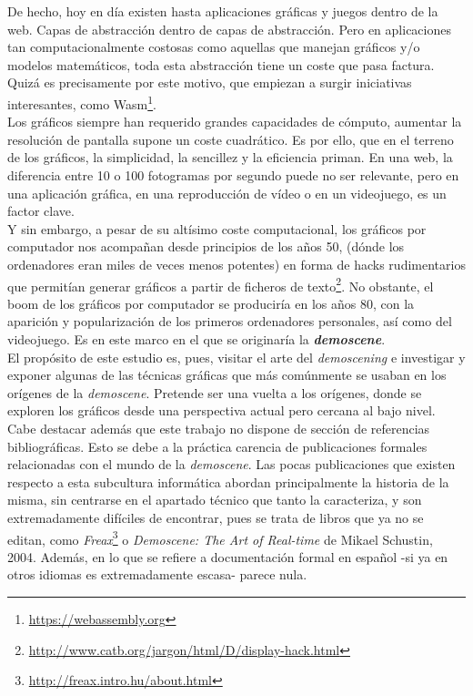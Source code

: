 De hecho, hoy en día existen hasta aplicaciones gráficas y juegos dentro de la web. Capas de abstracción dentro de capas de abstracción. Pero en aplicaciones tan computacionalmente costosas como aquellas que manejan gráficos y/o modelos matemáticos, toda esta abstracción tiene un coste que pasa factura. Quizá es precisamente por este motivo, que empiezan a surgir iniciativas interesantes, como Wasm\footnote{\url{https://webassembly.org}}.\\

Los gráficos siempre han requerido grandes capacidades de cómputo, aumentar la resolución de pantalla supone un coste cuadrático. Es por ello, que en el terreno de los gráficos, la simplicidad, la sencillez y la eficiencia priman. En una web, la diferencia entre 10 o 100 fotogramas por segundo puede no ser relevante, pero en una aplicación gráfica, en una reproducción de vídeo o en un videojuego, es un factor clave.\\

Y sin embargo, a pesar de su altísimo coste computacional, los gráficos por computador nos acompañan desde principios de los años 50, (dónde los ordenadores eran miles de veces menos potentes) en forma de hacks rudimentarios que permitían generar gráficos a partir de ficheros de texto\footnote{\url{http://www.catb.org/jargon/html/D/display-hack.html}}. No obstante, el boom de los gráficos por computador se produciría en los años 80, con la aparición y popularización de los primeros ordenadores personales, así como del videojuego. Es en este marco en el que se originaría la \textbf{\emph{demoscene}}.\\

El propósito de este estudio es, pues, visitar el arte del \emph{demoscening} e investigar y exponer algunas de las técnicas gráficas que más comúnmente se usaban en los orígenes de la \emph{demoscene}. Pretende ser una vuelta a los orígenes, donde se exploren los gráficos desde una perspectiva actual pero cercana al bajo nivel. \\

Cabe destacar además que este trabajo no dispone de sección de referencias bibliográficas. Esto se debe a la práctica carencia de publicaciones formales relacionadas con el mundo de la \emph{demoscene}. Las pocas publicaciones que existen respecto a esta subcultura informática abordan principalmente la historia de la misma, sin centrarse en el apartado técnico que tanto la caracteriza, y son extremadamente difíciles de encontrar, pues se trata de libros que ya no se editan, como \emph{Freax}\footnote{\url{http://freax.intro.hu/about.html}} o \emph{Demoscene: The Art of Real-time} de Mikael Schustin, 2004. Además, en lo que se refiere a documentación formal en español -si ya en otros idiomas es extremadamente escasa- parece nula.\\

